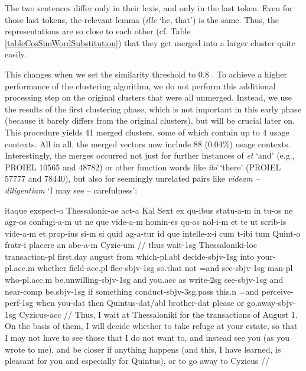 The two sentences differ only in their lexis, and only in the last token. Even for those last tokens, the relevant lemma (\textit{ille} `he, that') is the same. Thus, the representations are so close to each other (cf. Table \ref{tableCosSimWordSubstitution}) that they get merged into a larger cluster quite easily.

This changes when we set the similarity threshold to 0.8 . To achieve a higher performance of the clustering algorithm, we do not perform this additional processing step on the original clusters that were all unmerged. Instead, we use the results of the first clustering phase, which is not important in this early phase (because it barely differs from the original clusters), but will be crucial later on. This procedure yields 41 merged clusters, some of which contain up to 4 usage contexts. All in all, the merged vectors now include 88 (0.04\%) usage contexts. Interestingly, the merges occurred not just for further instances of \textit{et} `and' (e.g., PROIEL 10565 and 48782) or other function words like \textit{ibi} `there' (PROIEL 57777 and 78440), but also for seemingly unrelated pairs like \textit{videam -- diligentiam} `I may see -- carefulness': 

\vspace{10pt}
\ex[exno=PROIEL 77240]
	\par
	\begingl
		\gla itaque exspect-o Thessalonic-ae act-a Kal Sext ex qu-ibus statu-a-m in tu-os ne agr-os confugi-a-m ut ne que vide-a-m homin-es qu-os nol-i-m et te ut scrib-is vide-a-m et prop-ius si-m si quid ag-a-tur id que intelle-x-i cum t-ibi tum Quint-o fratr-i placere an abe-a-m Cyzic-um //
		\glb thus wait-{\sc 1sg} Thessaloniki-{\sc loc} transaction-{\sc pl} first.day august from which-{\sc pl.abl} decide-{\sc sbjv-1sg} into your-{\sc pl.acc.m} whether field-{\sc acc.pl} flee-{\sc sbjv-1sg} so.that not =and see-{\sc sbjv-1sg} man-{\sc pl} who-{\sc pl.acc.m} be.unwilling-{\sc sbjv-1sg} and you.{\sc acc} as write-{\sc 2sg} see-{\sc sbjv-1sg} and near-{\sc comp} be.{\sc sbjv-1sg} if something conduct-{\sc sbjv-3sg.pass} this.{\sc n} =and  perceive-{\sc perf-1sg} when you-{\sc dat} then Quintus-{\sc dat/abl} brother-{\sc dat} please or go.away-{\sc sbjv-1sg} Cyzicus-{\sc acc} //
		\glft Thus, I wait at Thessaloniki for the transactions of August 1. On the basis of them, I will decide whether to take refuge at your estate, so that I may not have to see those that I do not want to, and instead see you (as you wrote to me), and be closer if anything happens (and this, I have learned, is pleasant for you and especially for Quintus), or to go away to Cyzicus //
	\endgl
\xe 
\vspace{10pt}

